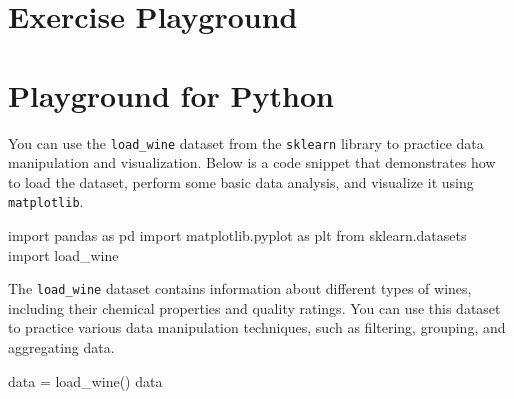 \documentclass[
  letterpaper,
  DIV=11,
  numbers=noendperiod]{scrreprt}
\newenvironment{Shaded}{\begin{snugshade}}{\end{snugshade}}
\newcommand{\ImportTok}[1]{\textcolor[rgb]{0.00,0.46,0.62}{#1}}
\newcommand{\NormalTok}[1]{\textcolor[rgb]{0.00,0.23,0.31}{#1}}
\newcommand{\OperatorTok}[1]{\textcolor[rgb]{0.37,0.37,0.37}{#1}}
\begin{document}
\chapter{Exercise Playground}\label{exercise-playground}

\chapter{Playground for Python}\label{playground-for-python}

You can use the \texttt{load\_wine} dataset from the \texttt{sklearn}
library to practice data manipulation and visualization. Below is a code
snippet that demonstrates how to load the dataset, perform some basic
data analysis, and visualize it using \texttt{matplotlib}.

\begin{Shaded}
\begin{Highlighting}[]
\ImportTok{import}\NormalTok{ pandas }\ImportTok{as}\NormalTok{ pd}
\ImportTok{import}\NormalTok{ matplotlib.pyplot }\ImportTok{as}\NormalTok{ plt}
\ImportTok{from}\NormalTok{ sklearn.datasets }\ImportTok{import}\NormalTok{ load\_wine}
\end{Highlighting}
\end{Shaded}

The \texttt{load\_wine} dataset contains information about different
types of wines, including their chemical properties and quality ratings.
You can use this dataset to practice various data manipulation
techniques, such as filtering, grouping, and aggregating data.

\begin{Shaded}
\begin{Highlighting}[]
\NormalTok{data }\OperatorTok{=}\NormalTok{ load\_wine()}
\NormalTok{data}
\end{Highlighting}
\end{Shaded}
\end{document}
